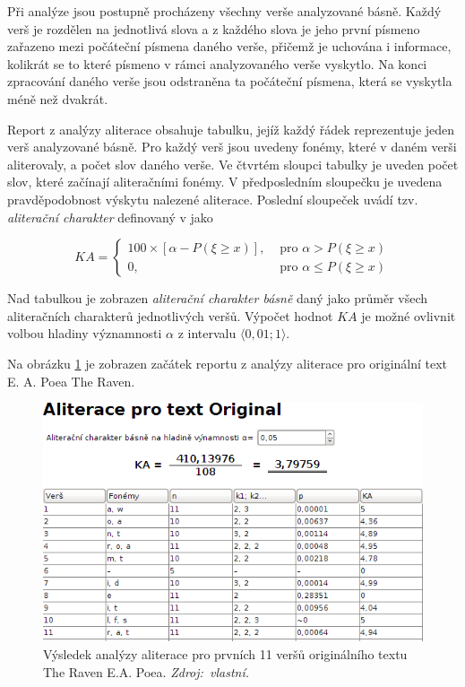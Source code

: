 \documentclass[dp.tex]{subfiles}
\begin{document}
Při analýze jsou postupně procházeny všechny verše analyzované básně. Každý verš je rozdělen na jednotlivá slova a z každého slova je jeho první písmeno zařazeno mezi počáteční písmena daného verše, přičemž je uchována i informace, kolikrát se to které písmeno v rámci analyzovaného verše vyskytlo. Na konci zpracování daného verše jsou odstraněna ta počáteční písmena, která se vyskytla méně než dvakrát.

Report z analýzy aliterace obsahuje tabulku, jejíž každý řádek reprezentuje jeden verš analyzované básně. Pro každý verš jsou uvedeny fonémy, které v daném verši aliterovaly, a počet slov daného verše. Ve čtvrtém sloupci tabulky je uveden počet slov, které začínají aliteračními fonémy. V předposledním sloupečku je uvedena pravděpodobnost výskytu nalezené aliterace. Poslední sloupeček uvádí tzv. \textit{aliterační charakter} definovaný v \cite[str.~60]{Wimmer2003} jako

\[KA = \left\{
  \begin{array}{lr}
    100 \times [ \alpha - P( \xi \geq x)],& \text{ pro } \alpha >  P( \xi \geq x)\\
    0,& \text{ pro } \alpha \leq  P( \xi \geq x)
  \end{array}
\right.
\]

Nad tabulkou je zobrazen \textit{aliterační charakter básně} daný jako průměr všech aliteračních charakterů jednotlivých veršů. Výpočet hodnot $KA$ je možné ovlivnit volbou hladiny významnosti $\alpha$ z intervalu $\langle 0{,}01; 1 \rangle$.

Na obrázku \ref{fig:alliteration} je zobrazen začátek reportu z analýzy aliterace pro originální text E. A. Poea The Raven.\newpage

\begin{figure}[H]
	\centering
	\includegraphics[max width=\textwidth,keepaspectratio=true]{imgs-70-prakticka/alliteration}
	\caption[Výsledek analýzy aliterace pro prvních 11 veršů originálního textu The Raven E.A. Poea]{Výsledek analýzy aliterace pro prvních 11 veršů originálního textu The Raven E.A. Poea. \textit{Zdroj:~vlastní.}}
	\label{fig:alliteration}
\end{figure}
\end{document}
